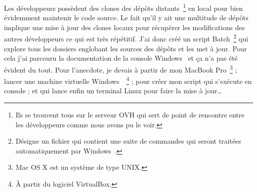 Les développeurs possèdent des clones des dépôts distants\,
\footnote{Ils se trouvent tous sur le serveur OVH qui sert de point de
rencontre entre les développeurs comme nous avons pu le voir.} en local
pour bien évidemment maintenir le code source. Le fait qu'il y ait une
multitude de dépôts implique une mise à jour des clones locaux pour
récupérer les modifications des autres développeurs ce qui est très
répétitif. J'ai donc créé un script Batch\, \footnote{Désigne un fichier
qui contient une suite de commandes qui seront traitées automatiquement
par Windows~\textregistered.} qui explore tous les dossiers englobant
les sources des dépôts et les met à jour. Pour cela j'ai parcouru la
documentation de la console Windows~\textregistered{} et ça n'a pas été
évident du tout. Pour l'anecdote, je devais à partir de mon MacBook
Pro\, \footnote{Mac OS X est un système de type UNIX.} ; lancer une
machine virtuelle Windows~\textregistered\, \footnote{À partir du
logiciel VirtualBox.} ; pour créer mon script qui s'exécute en console ;
et qui lance enfin un terminal Linux pour faire la mise à jour\dots

